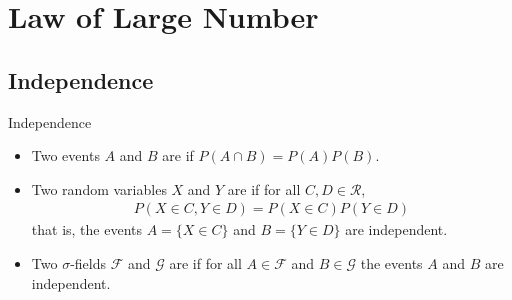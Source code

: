 \documentclass[../main.tex]{subfiles}
\begin{document}
\ifSubfilesClassLoaded{

    \tableofcontents
    
}{}

\chapter{ Law of Large Number }
\section{Independence}
\begin{definition}{Independence}{}
    \begin{itemize}
        \item  Two events $A$ and $B$ are  if $P(A \cap B) = P(A)P(B)$.
        \item Two random variables $X$ and $Y$ are  if for all $C, D \in \mathcal{R}$,
\[
\begin{aligned}
P(X \in C, Y \in D) = P(X \in C)P(Y \in D)
\end{aligned}
\]that is, the events $A = \{X \in C\}$ and $B = \{Y \in D\}$ are independent.
\item Two $\sigma$-fields $\mathcal{F}$ and $\mathcal{G}$ are  if for all $A \in \mathcal{F}$ and $B \in \mathcal{G}$ the events $A$ and $B$ are independent.
    \end{itemize}
\end{definition}
\end{document}
